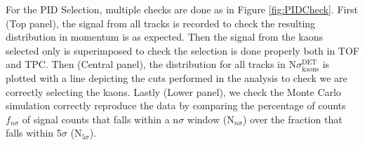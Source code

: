 For the PID Selection, multiple checks are done as in Figure \ref{fig:PIDCheck}. First (Top panel), the signal from all tracks is recorded to check the resulting distribution in momentum is as expected. Then the signal from the kaons selected only is superimposed to check the selection is done properly both in TOF and TPC. Then (Central panel), the distribution for all tracks in N$\sigma_{\text{kaons}}^{\text{DET}}$ is plotted with a line depicting the cuts performed in the analysis to check we are correctly selecting the kaons. Lastly (Lower panel), we check the Monte Carlo simulation correctly reproduce the data by comparing the percentage of counts $f_{n\sigma}$ of signal counts that falls within a n$\sigma$ window (N$_{n\sigma}$) over the fraction that falls within 5$\sigma$  (N$_{5\sigma}$).